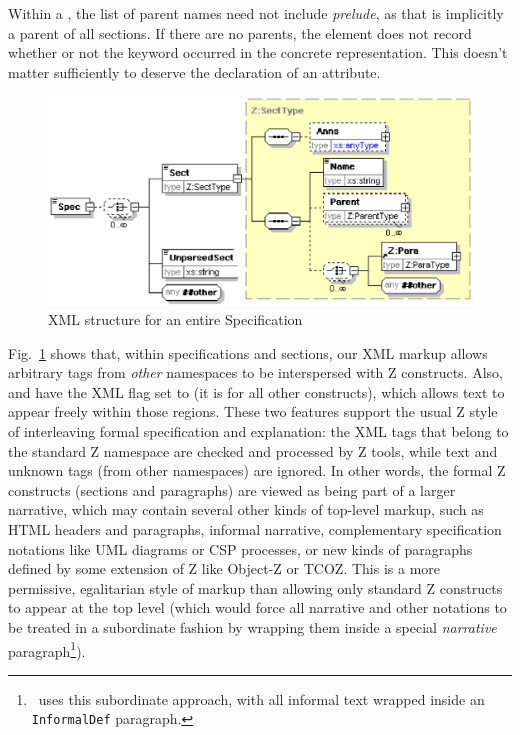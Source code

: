 \documentclass{llncs}  %
\begin{document}
Within a , the list of parent names need not include
\textit{prelude}, as that is implicitly a parent of all sections.
If there are no parents,
the  element does not record whether or not
the keyword  occurred in the concrete representation.
This doesn't matter sufficiently to deserve the declaration of an attribute.

\begin{figure}[htbp]
  \centering
  \includegraphics[width=\textwidth]{spec.eps}
  \caption{XML structure for an entire Specification}
  \label{fig:spec}
\end{figure}

Fig.~\ref{fig:spec} shows that, within specifications and sections, our XML
markup allows arbitrary tags from \emph{other} namespaces to be
interspersed with Z constructs.  
Also,  and  have the XML
 flag set to  (it is  for all other
constructs), which allows text to appear freely within those regions.
These two features support the usual Z style of interleaving formal
specification and explanation: the XML tags that belong to the standard Z
namespace are checked and processed by Z tools, while text and unknown tags
(from other namespaces) are ignored.  In other words, the formal Z
constructs (sections and paragraphs) are viewed as being part of a
larger narrative, which may contain several
other kinds of top-level markup, such as HTML headers and paragraphs,
informal narrative, complementary specification notations like UML diagrams
or CSP processes, or new kinds of paragraphs defined by some extension of Z
like Object-Z or TCOZ.  This is a more permissive, egalitarian style of
markup than allowing only standard Z constructs to appear at the top level
(which would force all narrative and other notations to be treated in a
subordinate fashion by wrapping them inside a special \emph{narrative}
paragraph\footnote{\CADiZ\ uses this subordinate approach, with all
  informal text wrapped inside an \texttt{InformalDef} paragraph.}).
\end{document}
